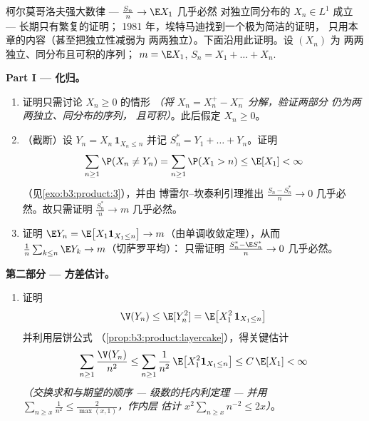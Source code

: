\begin{problem}
\label{pb:b3:probability:1}
柯尔莫哥洛夫强大数律 --- $\frac{S_n}n \to \E X_1$ 几乎必然
对独立同分布的 $X_n \in L^1$ 成立 --- 长期只有繁复的证明；
1981 年，埃特马迪找到一个极为简洁的证明，
只用本章的内容（甚至把独立性减弱为
两两独立）。下面沿用此证明。设 $(X_n)$ 为
两两独立、同分布且可积的序列；
$m = \E X_1$, $S_n = X_1 + \dots + X_n$.

\medskip
\noindent\textbf{Part I --- 化归。}
\begin{enumerate}
  \item 证明只需讨论 $X_n \geq 0$ 的情形
        \emph{（将 $X_n = X_n^+ - X_n^-$ 分解，验证两部分
        仍为两两独立、同分布的序列，
        且可积）}。此后假定 $X_n \geq 0$。
  \item （截断）设 $Y_n = X_n\,\mathbf 1_{X_n \leq n}$
        并记 $S_n^* = Y_1 + \dots + Y_n$。证明
        \[
        \sum_{n\geq1}\P(X_n \neq Y_n) =
        \sum_{n\geq1}\P(X_1 > n) \leq \E[X_1] < \infty
        \]
        （见\cref{exo:b3:product:3}），并由
        博雷尔–坎泰利引理推出 $\frac{S_n - S_n^*}{n} \to 0$
        几乎必然。故只需证明 $\frac{S^*_n}n \to m$
        几乎必然。
  \item 证明 $\E Y_n = \E\bigl[X_1\mathbf 1_{X_1\leq
        n}\bigr] \to m$（由单调收敛定理），从而
        $\frac1n\sum_{k\leq n}\E Y_k \to m$（切萨罗平均）：
        只需证明 $\frac{S_n^* - \E S_n^*}{n} \to 0$
        几乎必然。
\end{enumerate}

\medskip
\noindent\textbf{第二部分 --- 方差估计。}
\begin{enumerate}[resume]
  \item 证明
        \[
        \V(Y_n) \leq \E[Y_n^2] = \E\bigl[X_1^2\,\mathbf
        1_{X_1 \leq n}\bigr]
        \]
        并利用层饼公式
        （\cref{prop:b3:product:layercake}），得关键估计
        \[
        \sum_{n\geq1}\frac{\V(Y_n)}{n^2}
        \leq \sum_{n\geq1}\frac1{n^2}\,
        \E\bigl[X_1^2\mathbf 1_{X_1\leq n}\bigr]
        \leq C\,\E[X_1] < \infty
        \]
        \emph{（交换求和与期望的顺序 ---
        级数的托内利定理 --- 并用 $\sum_{n \geq
        x}\frac1{n^2} \leq \frac2{\max(x,1)}$，作内层
        估计 $x^2\sum_{n\geq x}n^{-2} \leq 2x$）}。
\end{enumerate}


\end{problem}
